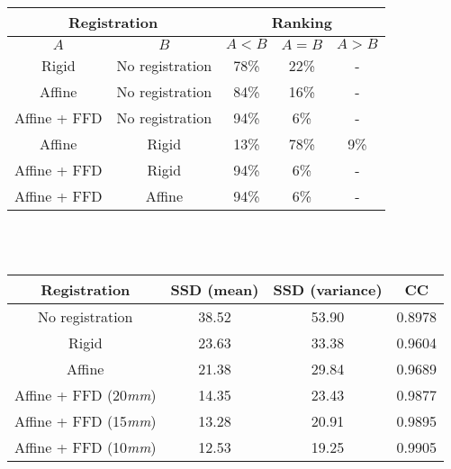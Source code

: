 \documentclass[11pt,a4paper,oneside]{report}
\begin{document}
 \begin{tabular}{ c | c | c | c | c }
 \hline
 \multicolumn{2}{c|}{Registration} &  \multicolumn{3}{|c}{Ranking}\\
 \hline
 $A$ & $B$ & $A < B$ & $A = B$ & $A > B$\\
  \hline
 Rigid & No registration & 78\% & 22\% & -\\
   \hline
 Affine & No registration & 84\% & 16\% & -\\
   \hline
 Affine + FFD & No registration & 94\% & 6\% & -\\
   \hline
 Affine & Rigid & 13\% & 78\% & 9\%\\
   \hline
 Affine + FFD & Rigid & 94\% & 6\% & -\\
   \hline
 Affine + FFD & Affine & 94\% & 6\% & -\\
   \hline
\end{tabular}\\\\


 \begin{tabular}{ c | c | c | c  }
 \hline
 Registration        &  SSD (mean) & SSD (variance) & CC\\
 \hline
 No registration     & 38.52& 53.90 & 0.8978\\
   \hline
 Rigid               & 23.63& 33.38 & 0.9604\\
   \hline
 Affine              & 21.38& 29.84 & 0.9689\\
   \hline
 Affine + FFD (20\textit{mm}) & 14.35& 23.43 & 0.9877\\
   \hline
 Affine + FFD (15\textit{mm}) & 13.28& 20.91 & 0.9895\\
   \hline
 Affine + FFD (10\textit{mm}) & 12.53& 19.25 & 0.9905\\
   \hline
\end{tabular}


 
\end{document}
